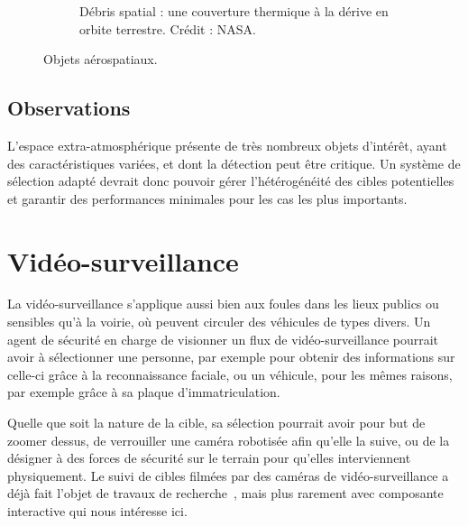 \begin{figure}[!htbp]
\begin{subfigure}[t]{0.57\textwidth}
            \caption[Débris spatial]{Débris spatial : une couverture thermique à la dérive en orbite terrestre. Crédit : NASA\protect\footnotemark.}
            \label{fig:spaceDeb}
        \end{subfigure}
        \label{fig:aerospace}
        \caption{Objets aérospatiaux.}
	\end{figure}
	
	\addtocounter{footnote}{-2}
	\addtocounter{footnote}{1}
	\addtocounter{footnote}{1}
	
	\subsection{Observations}
	L'espace extra-atmosphérique présente de très nombreux objets d'intérêt, ayant des caractéristiques variées, et dont la détection peut être critique. Un système de sélection adapté devrait donc pouvoir gérer l'hétérogénéité des cibles potentielles et garantir des performances minimales pour les cas les plus importants.	
	
	\section{Vidéo-surveillance}
	La vidéo-surveillance s'applique aussi bien aux foules dans les lieux publics ou sensibles qu'à la voirie, où peuvent circuler des véhicules de types divers. Un agent de sécurité en charge de visionner un flux de vidéo-surveillance pourrait avoir à sélectionner une personne, par exemple pour obtenir des informations sur celle-ci grâce à la reconnaissance faciale, ou un véhicule, pour les mêmes raisons, par exemple grâce à sa plaque d'immatriculation.
	
	Quelle que soit la nature de la cible, sa sélection pourrait avoir pour but de zoomer dessus, de verrouiller une caméra robotisée afin qu'elle la suive, ou de la désigner à des forces de sécurité sur le terrain pour qu'elles interviennent physiquement. Le suivi de cibles filmées par des caméras de vidéo-surveillance a déjà fait l'objet de travaux de recherche~\cite{lipton1998moving, nishimura1997video, benfold2011stable}, mais plus rarement avec composante interactive qui nous intéresse ici.
	
